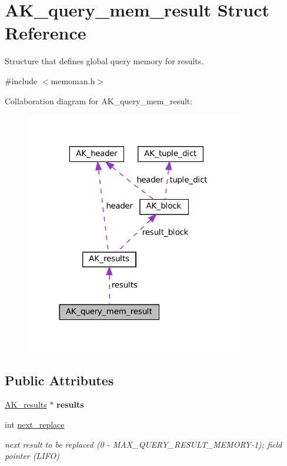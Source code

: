 \hypertarget{structAK__query__mem__result}{}\section{A\+K\+\_\+query\+\_\+mem\+\_\+result Struct Reference}
\label{structAK__query__mem__result}


Structure that defines global query memory for results.  




{\ttfamily \#include $<$memoman.\+h$>$}



Collaboration diagram for A\+K\+\_\+query\+\_\+mem\+\_\+result\+:\nopagebreak
\begin{figure}[H]
\begin{center}
\leavevmode
\includegraphics[width=270pt]{structAK__query__mem__result__coll__graph}
\end{center}
\end{figure}
\subsection*{Public Attributes}
\begin{DoxyCompactItemize}
\item 
\mbox{\label{structAK__query__mem__result_a59c89a5943e4a8a49e58472142b42f21}} 
\hyperlink{structAK__results}{A\+K\+\_\+results} $\ast$ {\bfseries results}
\item 
\mbox{\label{structAK__query__mem__result_a444ac5bc8a61cc3da3aedb9c762666a3}} 
int \hyperlink{structAK__query__mem__result_a444ac5bc8a61cc3da3aedb9c762666a3}{next\+\_\+replace}
\begin{DoxyCompactList}\small\item\em next result to be replaced (0 -\/ M\+A\+X\+\_\+\+Q\+U\+E\+R\+Y\+\_\+\+R\+E\+S\+U\+L\+T\+\_\+\+M\+E\+M\+O\+R\+Y-\/1); field pointer (L\+I\+FO) \end{DoxyCompactList}\end{DoxyCompactItemize}


